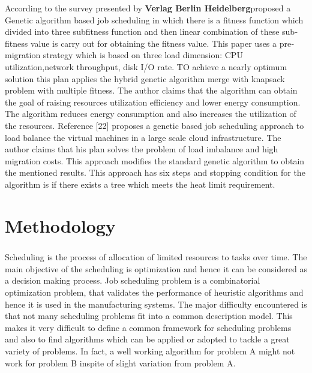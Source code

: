 \documentclass[a4paper,12pt]{report}
\begin{document}
{{{{{				\linespread{1.5}	According to the survey presented by \textbf{Verlag Berlin Heidelberg}proposed a Genetic algorithm based job scheduling in which there is a fitness
				function which divided into three sub­fitness function and then linear combination of
				these sub­fitness value is carry out for obtaining the fitness value. This paper uses a
				pre­migration strategy which is based on three load dimension: CPU utilization,network throughput, disk I/O rate. TO achieve a nearly optimum solution this plan
				applies the hybrid genetic algorithm merge with knapsack problem with multiple
				fitness. The author claims that the algorithm can obtain the goal of raising resources
				utilization efficiency and lower energy consumption. The algorithm reduces energy
				consumption and also increases the utilization of the resources.
				Reference [22] proposes a genetic based job scheduling approach to load balance the
				virtual machines in a large scale cloud infrastructure. The author claims that his plan
				solves the problem of load imbalance and high migration costs. This approach
				modifies the standard genetic algorithm to obtain the mentioned results. This approach
				has six steps and stopping condition for the algorithm is if there exists a tree which
				meets the heat limit requirement.
				
			
		
		\chapter{Methodology}
		\paragraph{}
		{
			\linespread{1.5}
			Scheduling  is  the  process  of  allocation  of  limited  resources  to  tasks  over  time.  The  main objective of the scheduling is optimization and hence it can be considered as a decision  making  process.  Job  scheduling  problem  is  a  combinatorial  optimization  problem, that validates the performance of heuristic algorithms and hence it is used in the  manufacturing  systems.  The  major  difficulty  encountered  is  that  not  many  scheduling problems fit into a common description model. This makes it very difficult to  define  a  common  framework  for  scheduling  problems  and  also  to  find  algorithms  which can be applied or adopted to tackle a great variety of problems. In fact, a well working  algorithm  for  problem  A  might  not  work  for  problem  B  inspite  of  slight  variation from problem A. 
			
}}}}}}
\end{document}
